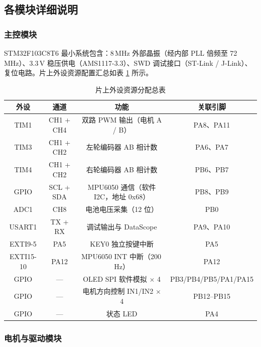 \documentclass[12pt,a4paper,UTF8]{ctexrep}
\begin{document}
\subsection{各模块详细说明}

\subsubsection{主控模块}

STM32F103C8T6 最小系统包含：8\,MHz 外部晶振（经内部 PLL 倍频至 72\,MHz）、3.3\,V 稳压供电（AMS1117-3.3）、SWD 调试接口（ST-Link / J-Link）、复位电路。片上外设资源配置汇总如表 \ref{tbl:peripheral} 所示。

\begin{table}[H]
  \centering
  \caption{片上外设资源分配总表}
  \label{tbl:peripheral}
  \small
  \begin{tabular}{cccc}
    \toprule
    \textbf{外设} & \textbf{通道} & \textbf{功能} & \textbf{关联引脚} \\
    \midrule
    TIM1     & CH1 + CH4    & 双路 PWM 输出（电机 A / B） & PA8、PA11 \\
    TIM3     & CH1 + CH2    & 左轮编码器 AB 相计数      & PA6、PA7 \\
    TIM4     & CH1 + CH2    & 右轮编码器 AB 相计数      & PB6、PB7 \\
    GPIO     & SCL + SDA    & MPU6050 通信（软件 I2C，地址 0x68） & PB8、PB9 \\
    ADC1     & CH8          & 电池电压采集（12 位）     & PB0 \\
    USART1   & TX + RX      & 调试输出与 DataScope      & PA9、PA10 \\
    EXTI9-5  & PA5          & KEY0 独立按键中断         & PA5 \\
    EXTI15-10 & PA12        & MPU6050 INT 中断（200\,Hz） & PA12 \\
    GPIO     & —            & OLED SPI 软件模拟 $\times$ 4 & PB3/PB4/PB5/PA1/PA15 \\
    GPIO     & —            & 电机方向控制 IN1/IN2 $\times$ 4 & PB12--PB15 \\
    GPIO     & —            & 状态 LED                  & PA4 \\
    \bottomrule
  \end{tabular}
\end{table}

\subsubsection{电机与驱动模块}
\end{document}
